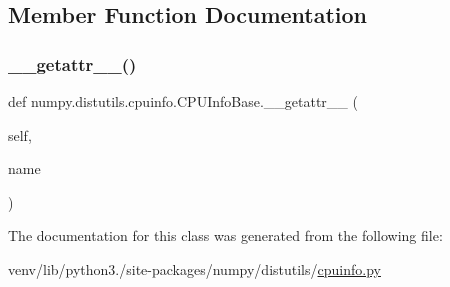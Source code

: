 \subsection{Member Function Documentation}
\mbox{\label{classnumpy_1_1distutils_1_1cpuinfo_1_1CPUInfoBase_a3bdc629ec0638deeba3fb955ec399b3a}} 
\subsubsection{\texorpdfstring{\+\_\+\+\_\+getattr\+\_\+\+\_\+()}{\_\_getattr\_\_()}}
{\footnotesize\ttfamily def numpy.\+distutils.\+cpuinfo.\+C\+P\+U\+Info\+Base.\+\_\+\+\_\+getattr\+\_\+\+\_\+ (\begin{DoxyParamCaption}\item[{}]{self,  }\item[{}]{name }\end{DoxyParamCaption})}



The documentation for this class was generated from the following file\+:\begin{DoxyCompactItemize}
\item 
venv/lib/python3./site-\/packages/numpy/distutils/\hyperlink{cpuinfo_8py}{cpuinfo.\+py}\end{DoxyCompactItemize}
